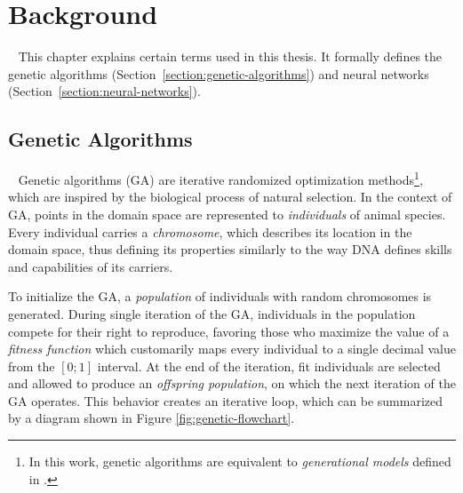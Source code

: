 \chapter{Background}~\label{chapter:background}
This chapter explains certain terms used in this thesis. It formally defines the genetic algorithms (Section~\ref{section:genetic-algorithms}) and neural networks (Section~\ref{section:neural-networks}).

\section{Genetic Algorithms}~\label{section:genetic-algorithms}
Genetic algorithms (GA) are iterative randomized optimization methods\footnote{In this work, genetic algorithms are equivalent to \textit{generational models} defined in \cite{AdaptationInSystems}.}, which are inspired by the biological process of natural selection. In the context of GA, points in the domain space are represented to \textit{individuals} of animal species. Every individual carries a \textit{chromosome}, which describes its location in the domain space, thus defining its properties similarly to the way DNA defines skills and capabilities of its carriers.

To initialize the GA, a \textit{population} of individuals with random chromosomes is generated. During single iteration of the GA, individuals in the population compete for their right to reproduce, favoring those who maximize the value of a \textit{fitness function} which customarily maps every individual to a single decimal value from the $[0;1]$ interval. At the end of the iteration, fit individuals are selected and allowed to produce an \textit{offspring population}, on which the next iteration of the GA operates. This behavior creates an iterative loop, which can be summarized by a diagram shown in Figure \ref{fig:genetic-flowchart}.

